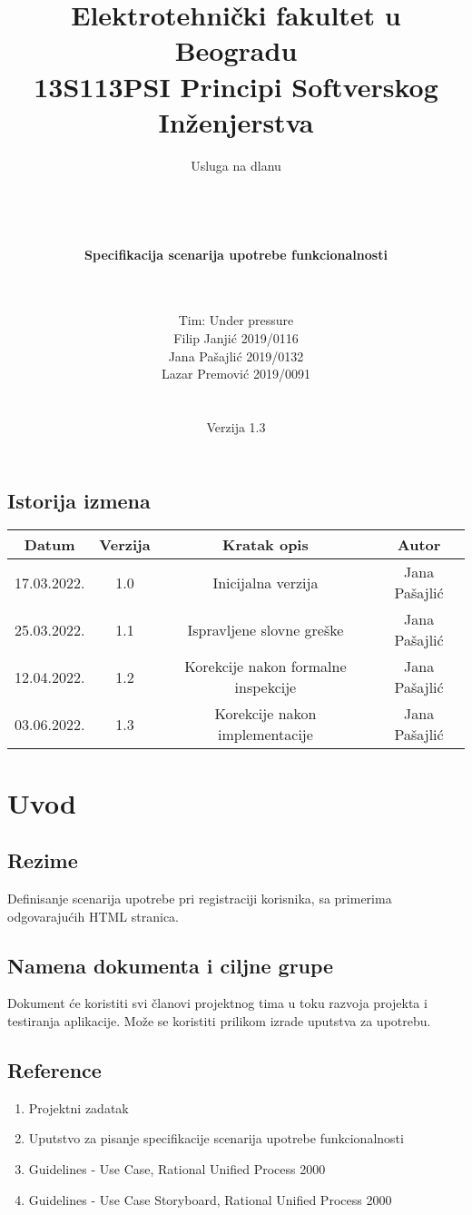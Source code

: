 \documentclass[a4paper,12pt]{report}
\title{\Large Elektrotehnički fakultet u Beogradu \\ 13S113PSI Principi Softverskog Inženjerstva}
\author{\Huge Usluga na dlanu\\ \ \\ \ \\ \ \\ \ \\
	\Large \textbf{Specifikacija scenarija upotrebe funkcionalnosti}\\\Large \textbf{\genitivfunkcionalnosti} \\ \ \\}
\date{\Large   Tim: Under pressure \\ Filip Janjić 2019/0116 \\ Jana Pašajlić 2019/0132 \\ Lazar Premović 2019/0091  \\ \  \\ \  \\\large Verzija 1.3}
\newcommand{\dativfunkcionalnosti }{registraciji korisnika}
\newcommand{\inicijalniautor}{Jana Pašajlić}
\newcommand{\inicijalnidatum}{17.03.2022.}
\begin{document}
\maketitle

\begin{center}
\section*{Istorija izmena}
\begin{tabular}{ |c|c|c|c| }
\hline
\textbf{Datum} & \textbf{Verzija} & \textbf{Kratak opis} & \textbf{Autor} \\ 
\hline
 \inicijalnidatum & 1.0  & Inicijalna verzija & \inicijalniautor \\
 \hline
 25.03.2022. & 1.1  & Ispravljene slovne greške & \inicijalniautor \\
 \hline
 12.04.2022. & 1.2  & Korekcije nakon formalne inspekcije & \inicijalniautor \\
 \hline
 03.06.2022. & 1.3  & Korekcije nakon implementacije & \inicijalniautor \\
 \hline
\end{tabular}
\end{center}
\newpage

\tableofcontents

\newpage
\section{Uvod}
\subsection{Rezime}
Definisanje scenarija upotrebe pri \dativfunkcionalnosti, sa primerima odgovarajućih HTML stranica.
\subsection{Namena dokumenta i ciljne grupe}
Dokument će koristiti svi članovi projektnog tima u toku razvoja projekta i testiranja aplikacije. Može se koristiti prilikom izrade uputstva za upotrebu.
\subsection{Reference}
    \begin{enumerate}
        \item Projektni zadatak
        \item Uputstvo za pisanje specifikacije scenarija upotrebe funkcionalnosti 
        \item Guidelines - Use Case, Rational Unified Process 2000
        \item Guidelines - Use Case Storyboard, Rational Unified Process 2000
    \end{enumerate}
\end{document}
